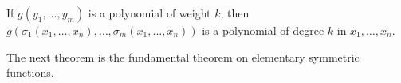 If $g(y_1, \ldots, y_m)$ is a polynomial of weight $k$, then $g(\sigma_1(x_1, \ldots, x_n), \ldots, \sigma_m(x_1, \ldots, x_n))$ is a polynomial of degree $k$ in $x_1, \ldots, x_n$.

The next theorem is the fundamental theorem on elementary symmetric functions.
